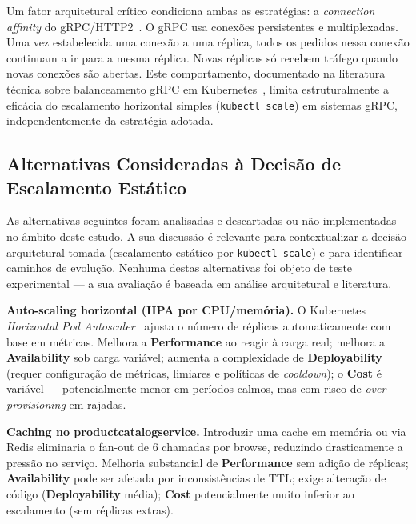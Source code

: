 \documentclass[manuscript,screen,review]{acmart}
\begin{document}
Um fator arquitetural crítico condiciona ambas as estratégias: a \textit{connection affinity} do gRPC/HTTP2~\cite{grpcloadbalancing,k8sgrpc}. O gRPC usa conexões persistentes e multiplexadas. Uma vez estabelecida uma conexão a uma réplica, todos os pedidos nessa conexão continuam a ir para a mesma réplica. Novas réplicas só recebem tráfego quando novas conexões são abertas. Este comportamento, documentado na literatura técnica sobre balanceamento gRPC em Kubernetes~\cite{k8sgrpc}, limita estruturalmente a eficácia do escalamento horizontal simples (\texttt{kubectl scale}) em sistemas gRPC, independentemente da estratégia adotada.

\subsection{Alternativas Consideradas à Decisão de Escalamento Estático}

As alternativas seguintes foram analisadas e descartadas ou não implementadas no âmbito deste estudo. A sua discussão é relevante para contextualizar a decisão arquitetural tomada (escalamento estático por \texttt{kubectl scale}) e para identificar caminhos de evolução. Nenhuma destas alternativas foi objeto de teste experimental — a sua avaliação é baseada em análise arquitetural e literatura.

\textbf{Auto-scaling horizontal (HPA por CPU/memória).} O Kubernetes \textit{Horizontal Pod Autoscaler}~\cite{k8shpa} ajusta o número de réplicas automaticamente com base em métricas. Melhora a \textbf{Performance} ao reagir à carga real; melhora a \textbf{Availability} sob carga variável; aumenta a complexidade de \textbf{Deployability} (requer configuração de métricas, limiares e políticas de \textit{cooldown}); o \textbf{Cost} é variável — potencialmente menor em períodos calmos, mas com risco de \textit{over-provisioning} em rajadas.

\textbf{Caching no productcatalogservice.} Introduzir uma cache em memória ou via Redis eliminaria o fan-out de 6 chamadas por browse, reduzindo drasticamente a pressão no serviço. Melhoria substancial de \textbf{Performance} sem adição de réplicas; \textbf{Availability} pode ser afetada por inconsistências de TTL; exige alteração de código (\textbf{Deployability} média); \textbf{Cost} potencialmente muito inferior ao escalamento (sem réplicas extras).
\end{document}
